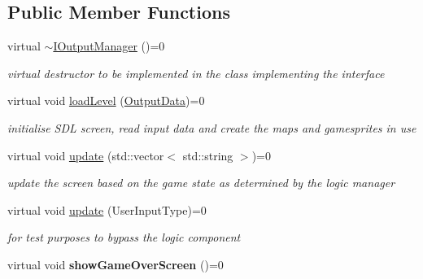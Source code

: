 \subsection*{Public Member Functions}
\begin{DoxyCompactItemize}
\item 
virtual \mbox{\hyperlink{class_i_output_manager_a7442c5161bf453dc13605f7aaeeea2b5}{$\sim$\+I\+Output\+Manager}} ()=0
\begin{DoxyCompactList}\small\item\em virtual destructor to be implemented in the class implementing the interface \end{DoxyCompactList}\item 
\mbox{\label{class_i_output_manager_a50a935d76cf10427b0977406a2338146}} 
virtual void \mbox{\hyperlink{class_i_output_manager_a50a935d76cf10427b0977406a2338146}{load\+Level}} (\mbox{\hyperlink{class_output_data}{Output\+Data}})=0
\begin{DoxyCompactList}\small\item\em initialise S\+DL screen, read input data and create the maps and gamesprites in use \end{DoxyCompactList}\item 
\mbox{\label{class_i_output_manager_aaebb6c7029ac00c7ce293272a5e854e3}} 
virtual void \mbox{\hyperlink{class_i_output_manager_aaebb6c7029ac00c7ce293272a5e854e3}{update}} (std\+::vector$<$ std\+::string $>$)=0
\begin{DoxyCompactList}\small\item\em update the screen based on the game state as determined by the logic manager \end{DoxyCompactList}\item 
\mbox{\label{class_i_output_manager_aef1aaf499f3eee5927cb2833af39ce43}} 
virtual void \mbox{\hyperlink{class_i_output_manager_aef1aaf499f3eee5927cb2833af39ce43}{update}} (User\+Input\+Type)=0
\begin{DoxyCompactList}\small\item\em for test purposes to bypass the logic component \end{DoxyCompactList}\item 
\mbox{\label{class_i_output_manager_adc5ca9af7dc69324ee87233dcc7befc4}} 
virtual void {\bfseries show\+Game\+Over\+Screen} ()=0
\end{DoxyCompactItemize}


